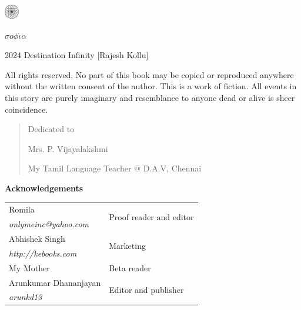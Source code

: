 \begin{center}
\HUGE{\thetitle}
\end{center}
\cleardoublepage

\begin{center}
\HUGE{\thetitle}
\end{center}

\begin{center}
\LARGE{\theauthor}
\end{center}

\vfill

\begin{center}
    \includegraphics[width=18pt]{logo.pdf}

    $\sigma o \phi \acute{\iota} \alpha$
\end{center}
\clearpage

\begingroup
\footnotesize
\setlength{\parindent}{0pt}
\setlength{\parskip}{\baselineskip}

\textcopyright{} 2024 Destination Infinity [Rajesh Kollu]

All rights reserved. No part of this book may be copied or reproduced anywhere
without the written consent of the author. This is a work of fiction. All events
in this story are purely imaginary and resemblance to anyone dead or alive is sheer
coincidence.

\endgroup
\clearpage

\begin{quote}
\begin{center}Dedicated to

\Large
Mrs. P. Vijayalakshmi
\normalsize

My Tamil Language Teacher @ D.A.V, Chennai
\end{center}
\end{quote}

\vfill

\textbf{Acknowledgements}

\footnotesize
\begin{tabular}{ll}
    Romila & \multirow{2}{*}{Proof reader and editor} \\
    \emph{onlymeinc@yahoo.com} & \\
    Abhishek Singh & \multirow{2}{*}{Marketing} \\
    \emph{http://kebooks.com} & \\
    My Mother & Beta reader \\
    Arunkumar Dhananjayan & \multirow{2}{*}{Editor and publisher} \\
    \emph{arunkd13} & \\
\end{tabular}

\clearpage